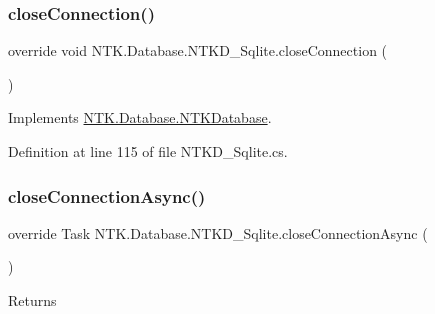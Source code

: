 \mbox{\label{class_n_t_k_1_1_database_1_1_n_t_k_d___sqlite_a36b5c0b45b522901901555dd1bbae968}} 
\subsubsection{\texorpdfstring{closeConnection()}{closeConnection()}}
{\footnotesize\ttfamily override void N\+T\+K.\+Database.\+N\+T\+K\+D\+\_\+\+Sqlite.\+close\+Connection (\begin{DoxyParamCaption}{ }\end{DoxyParamCaption})\hspace{0.3cm}{\ttfamily [virtual]}}







Implements \mbox{\hyperlink{class_n_t_k_1_1_database_1_1_n_t_k_database_a0c7312d31c1a7df56e7a70ae72c08d89}{N\+T\+K.\+Database.\+N\+T\+K\+Database}}.



Definition at line 115 of file N\+T\+K\+D\+\_\+\+Sqlite.\+cs.

\mbox{\label{class_n_t_k_1_1_database_1_1_n_t_k_d___sqlite_ae728bf6ed129be1e86b382152394cd7c}} 
\subsubsection{\texorpdfstring{closeConnectionAsync()}{closeConnectionAsync()}}
{\footnotesize\ttfamily override Task N\+T\+K.\+Database.\+N\+T\+K\+D\+\_\+\+Sqlite.\+close\+Connection\+Async (\begin{DoxyParamCaption}{ }\end{DoxyParamCaption})\hspace{0.3cm}{\ttfamily [virtual]}}





\begin{DoxyReturn}{Returns}

\end{DoxyReturn}


